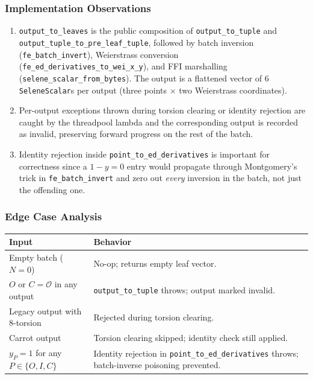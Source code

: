\documentclass[12pt,titlepage,table]{article}
\begin{document}
\newpage
\subsubsection{Implementation Observations}
\begin{enumerate}
    \item \verb+output_to_leaves+ is the public composition of \verb+output_to_tuple+ and \\\verb+output_tuple_to_pre_leaf_tuple+, followed by batch inversion (\verb+fe_batch_invert+), Weierstrass conversion (\verb+fe_ed_derivatives_to_wei_x_y+), and FFI marshalling \\ (\verb+selene_scalar_from_bytes+).  The output is a flattened vector of $6$ \verb+SeleneScalar+s per output (three points $\times$ two Weierstrass coordinates).
    \item Per-output exceptions thrown during torsion clearing or identity rejection are caught by the threadpool lambda and the corresponding output is recorded as invalid, preserving forward progress on the rest of the batch.
    \item Identity rejection inside \verb+point_to_ed_derivatives+ is important for correctness since a $1 - y = 0$ entry would propagate through Montgomery's trick in \verb+fe_batch_invert+ and zero out \emph{every} inversion in the batch, not just the offending one.
\end{enumerate}

\subsubsection{Edge Case Analysis}
\begin{table}[htbp]
\centering
{
\begin{tabular}{| p{1.8in} | p{4.3in} |}
\hline
\textbf{Input} & \textbf{Behavior} \\
\hline
\hline
Empty batch ($N = 0$) & No-op; returns empty leaf vector. \\
$O$ or $C = \mathcal{O}$ in any output & \verb+output_to_tuple+ throws; output marked invalid. \\
Legacy output with $8$-torsion & Rejected during torsion clearing. \\
Carrot output & Torsion clearing skipped; identity check still applied. \\
$y_P = 1$ for any $P \in \{O,I,C\}$ & Identity rejection in \verb+point_to_ed_derivatives+ throws; batch-inverse poisoning prevented. \\
\hline
\end{tabular}}
\end{table}
\end{document}
